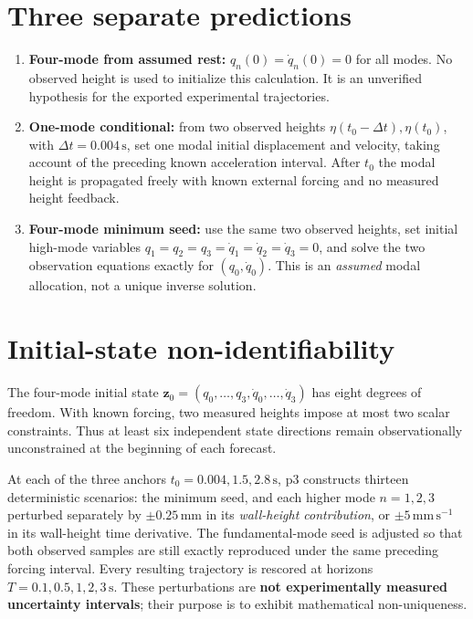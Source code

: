 \documentclass[10pt,a4paper]{article}
\begin{document}
\section*{Three separate predictions}
\begin{enumerate}
\item \textbf{Four-mode from assumed rest:} $q_n(0)=\dot q_n(0)=0$ for all modes. No observed height is used to initialize this calculation. It is an unverified hypothesis for the exported experimental trajectories.
\item \textbf{One-mode conditional:} from two observed heights $\eta(t_0-\Delta t),\eta(t_0)$, with $\Delta t=0.004\,\mathrm{s}$, set one modal initial displacement and velocity, taking account of the preceding known acceleration interval. After $t_0$ the modal height is propagated freely with known external forcing and no measured height feedback.
\item \textbf{Four-mode minimum seed:} use the same two observed heights, set initial high-mode variables $q_1=q_2=q_3=\dot q_1=\dot q_2=\dot q_3=0$, and solve the two observation equations exactly for $(q_0,\dot q_0)$. This is an \emph{assumed} modal allocation, not a unique inverse solution.
\end{enumerate}

\section*{Initial-state non-identifiability}
The four-mode initial state $\mathbf z_0=(q_0,\dots,q_3,\dot q_0,\dots,\dot q_3)$ has eight degrees of freedom. With known forcing, two measured heights impose at most two scalar constraints. Thus at least six independent state directions remain observationally unconstrained at the beginning of each forecast.

At each of the three anchors $t_0=0.004,1.5,2.8\,\mathrm s$, p3 constructs thirteen deterministic scenarios: the minimum seed, and each higher mode $n=1,2,3$ perturbed separately by $\pm0.25\,\mathrm{mm}$ in its \emph{wall-height contribution}, or $\pm5\,\mathrm{mm\,s^{-1}}$ in its wall-height time derivative. The fundamental-mode seed is adjusted so that both observed samples are still exactly reproduced under the same preceding forcing interval. Every resulting trajectory is rescored at horizons $T=0.1,0.5,1,2,3\,\mathrm s$. These perturbations are \textbf{not experimentally measured uncertainty intervals}; their purpose is to exhibit mathematical non-uniqueness.
\end{document}
